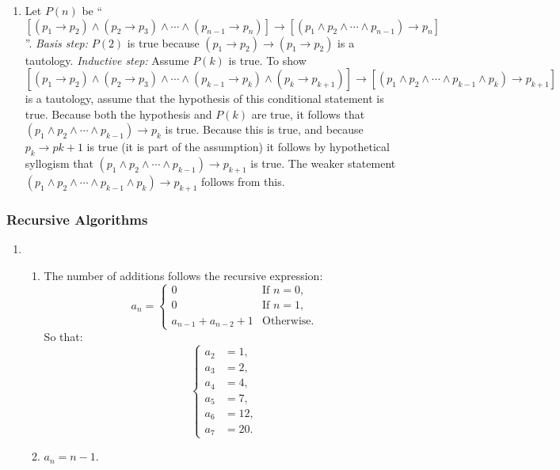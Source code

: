 \documentclass{../../cls/sig-alternate-05-2015}
\begin{document}
\begin{enumerate}
\item Let $P(n)$ be \textquotedblleft $[(p_1 \rightarrow p_2) \wedge (p_2 \rightarrow p_3) \wedge \cdots \wedge (p_{n - 1} \rightarrow p_n)] \rightarrow [(p_1 \wedge p_2 \wedge \cdots \wedge p_{n - 1}) \rightarrow p_n]$\textquotedblright . \textit{Basis step:} $P(2)$ is true because $(p_1 \rightarrow p_2) \rightarrow (p_1 \rightarrow p_2)$ is a tautology. \textit{Inductive step:} Assume $P(k)$ is true. To show $[(p_1 \rightarrow p_2) \wedge (p_2 \rightarrow p_3) \wedge \cdots \wedge (p_{k - 1} \rightarrow p_k) \wedge (p_k \rightarrow p_{k + 1})] \rightarrow [(p_1 \wedge p_2 \wedge \cdots \wedge p_{k - 1} \wedge p_k) \rightarrow p_{k + 1}]$ is a tautology, assume that the hypothesis of this conditional
statement is true. Because both the hypothesis and $P(k)$ are
true, it follows that $(p_1 \wedge p_2 \wedge \cdots \wedge p_{k - 1}) \rightarrow p_k$ is true. Because
this is true, and because $p_k \rightarrow p{k + 1}$ is true (it is part
of the assumption) it follows by hypothetical syllogism that
$(p_1 \wedge p_2 \wedge \cdots \wedge p_{k - 1}) \rightarrow p_{k + 1}$ is true. The weaker statement $(p_1 \wedge p_2 \wedge \cdots \wedge p_{k - 1} \wedge p_k) \rightarrow p_{k + 1}$ follows from this.
\end{enumerate}

\subsubsection{Recursive Algorithms}
\begin{enumerate}
\item \begin{enumerate}
	\item The number of additions follows the recursive expression:\begin{equation}
		a_n = \begin{cases}
		0 & \text{If } n = 0,\\
		0 & \text{If } n = 1,\\
		a_{n - 1} + a_{n - 2} + 1 & \text{Otherwise.}
		\end{cases}
	\end{equation} So that: \begin{equation}
		\begin{cases}
		a_2 & = 1,\\
		a_3 & = 2,\\
		a_4 & = 4,\\
		a_5 & = 7,\\
		a_6 & = 12,\\
		a_7 & = 20.
		\end{cases}
	\end{equation}
	\item $a_n = n - 1$.
\end{enumerate}
\end{enumerate}
\end{document}
